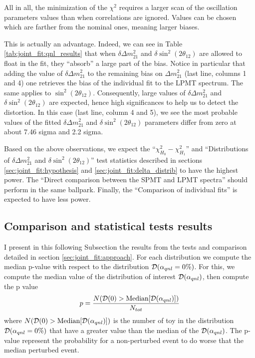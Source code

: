 \documentclass[../main.tex]{subfiles}
\begin{document}
All in all, the minimization of the $\chi^2$ requires a larger scan of the oscillation parameters values than when correlations are ignored. Values can be chosen which are farther from the nominal ones, meaning larger biases.

This is actually an advantage. Indeed, we can see in Table \ref{tab:joint_fit:qnl_results} that when $\delta \Delta m^2_{21}$ and $\delta \sin^2(2 \theta_{12})$ are allowed to float in the fit, they ``absorb'' a large part of the bias. Notice in particular that adding the value of $\delta \Delta m^2_{21}$ to the remaining bias on $\Delta m^2_{21}$ (last line, columns 1 and 4) one retrieves the bias of the individual fit to the LPMT spectrum. The same applies to $\sin^2(2\theta_{12})$. Consequently, large values of $\delta \Delta m^2_{21}$ and  $\delta \sin^2(2 \theta_{12})$ are expected, hence high significances to help us to detect the distortion. In this case (last line, column 4 and 5), we see the most probable values of the fitted $\delta \Delta m^2_{21}$ and $\delta \sin^2(2 \theta_{12})$ parameters differ from zero at about 7.46 sigma and 2.2 sigma.

Based on the above observations, we expect the ``$\chi^2_{H_0}-\chi^2_{H_1}$'' and ``Distributions of $\delta \Delta m^2_{21}$
and  $\delta \sin^2(2 \theta_{12})$'' test statistics described in sections \ref{sec:joint_fit:hypothesis} and \ref{sec:joint_fit:delta_distrib} to have the highest power.
The ``Direct comparison between the SPMT and LPMT spectra'' should perform in the same ballpark. Finally, the ``Comparison of individual fits'' is expected to have less power.

\subsection{Comparison and statistical tests results}

I present in this following Subsection the results from the tests and comparison detailed in section \ref{sec:joint_fit:approach}. For each distribution we compute the median p-value with respect to the distribution ${\cal D}(\alpha_{qnl} = 0\%)$. For this, we compute the median value of the distribution of interest ${\cal D}(\alpha_{qnl})$, then compute the p value
\begin{equation}
  p = \frac{N({\cal D}(0) > \text{Median}[{\cal D}(\alpha_{qnl})])}{N_{tot}}
\end{equation}
where $N({\cal D}(0) > \text{Median}[{\cal D}(\alpha_{qnl})])$ is the number of toy in the distribution ${\cal D}(\alpha_{qnl} = 0\%)$ that have a greater value than the median of the ${\cal D}(\alpha_{qnl})$. The p-value represent the probability for a non-perturbed event to do worse that the median perturbed event.
\end{document}
